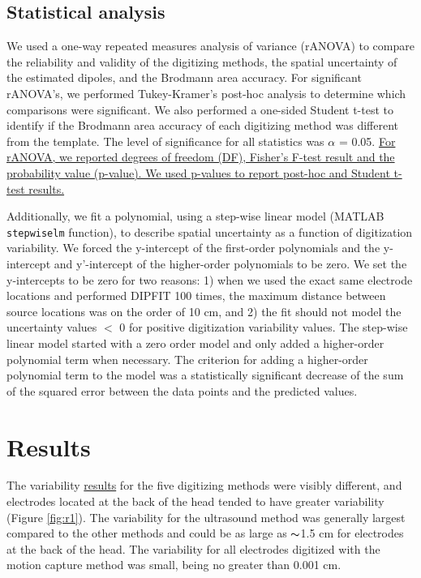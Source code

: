 \documentclass[../thesis_seyed.tex]{subfiles}
\begin{document}
\subsection{Statistical analysis}
We used a one-way repeated measures analysis of variance (rANOVA) to compare the reliability and validity of the digitizing methods, the spatial uncertainty of the estimated dipoles, and the Brodmann area accuracy. For significant rANOVA's, we performed Tukey-Kramer's post-hoc analysis to determine which comparisons were significant. We also performed a one-sided Student t-test to identify if the Brodmann area accuracy of each digitizing method was different from the template. The level of significance for all statistics was $\alpha$ = 0.05. \ul{For rANOVA, we reported degrees of freedom (DF), Fisher's F-test result and the probability value (p-value). We used p-values to report post-hoc and Student t-test results.} 

Additionally, we fit a polynomial, using a step-wise linear model (MATLAB {\tt stepwiselm} function), to describe spatial uncertainty as a function of digitization variability. We forced the y-intercept of the first-order polynomials and the y-intercept and y'-intercept of the higher-order polynomials to be zero. We set the y-intercepts to be zero for two reasons: 1) when we used the exact same electrode locations and performed DIPFIT 100 times, the maximum distance between source locations was on the order of 10 cm, and 2) the fit should not model the uncertainty values $<$ 0 for positive digitization variability values. The step-wise linear model started with a zero order model and only added a higher-order polynomial term when necessary. The criterion for adding a higher-order polynomial term to the model was a statistically significant decrease of the sum of the squared error between the data points and the predicted values.

\section{Results}

The variability \ul{results} for the five digitizing methods were visibly different, and electrodes located at the back of the head tended to have greater variability (Figure \ref{fig:r1}). The variability for the ultrasound method was generally largest compared to the other methods and could be as large as $\thicksim$1.5 cm for electrodes at the back of the head. The variability for all electrodes digitized with the motion capture method was small, being no greater than 0.001 cm. 
\end{document}

